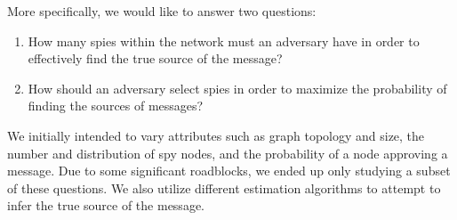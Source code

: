 More specifically, we would like to answer two questions:
\begin{enumerate}
\item How many spies within the network must an adversary have in order to effectively find the true source of the message?
\item How should an adversary select spies in order to maximize the probability of finding the sources of messages? 
\end{enumerate}
We initially intended to vary attributes such as graph topology and size, the number and distribution of spy nodes, and the probability of a node approving a message. Due to some significant roadblocks, we ended up only studying a subset of these questions. We also utilize different estimation algorithms to attempt to infer the true source of the message. 

